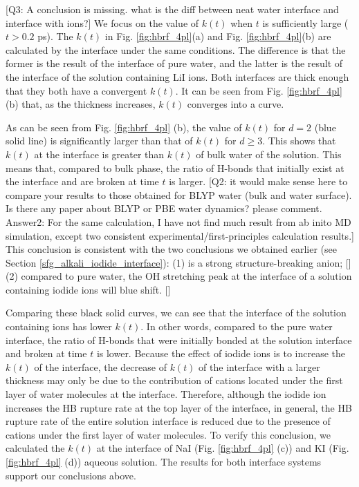 {\color{red}[Q3: A conclusion is missing. what is the diff between neat water interface and interface with ions?]}
{\color{blue} We focus on the value of $k(t)$ when $t$ is sufficiently large ($t>0.2$ ps). 
The $k(t)$ in Fig. \ref{fig:hbrf_4pl}(a) and Fig. \ref{fig:hbrf_4pl}(b) are calculated by the interface 
under the same conditions. The difference is that the former is the result of the interface of pure water,
and the latter is the result of the interface of the solution containing LiI ions. 
Both interfaces are thick enough that they both have a convergent $k(t)$. 
It can be seen from Fig. \ref{fig:hbrf_4pl} (b) that, as the thickness increases, $k(t)$ converges into a curve.}

{\color{blue} As can be seen from Fig. \ref{fig:hbrf_4pl} (b), the value of $k (t)$ for $d = 2$ \A (blue solid line) is significantly larger 
than that of $k(t)$ for $d \ge 3$. This shows that $k(t)$ at the interface is greater than $k(t)$ of bulk water of the solution. 
This means that, compared to bulk phase, the ratio of H-bonds that initially exist at the interface and are broken at time $t$ is larger.
{\color{red}[Q2: it would make sense here to compare your results to those obtained for BLYP water (bulk and water surface). Is there any paper about BLYP or PBE water dynamics? please comment. Answer2: For the same calculation, I have not find much result from ab inito MD simulation, except 
two consistent experimental/first-principles calculation results.]}
This conclusion is consistent with the two conclusions we obtained earlier (see Section \ref{sfg_alkali_iodide_interface}): 
(1) \I is a strong structure-breaking anion; [\cite{Trevani2000}] 
(2) compared to pure water, the OH stretching peak at the interface of a solution containing iodide ions will blue shift. [\cite{Tongraar2010}] 

Comparing these black solid curves, we can see that the interface of the solution containing ions has lower $k(t)$.
In other words, compared to the pure water interface, 
the ratio of H-bonds that were initially bonded at the solution interface and broken at time $t$ is lower.
Because the effect of iodide ions is to increase the $k(t)$ of the interface, the decrease of $k (t)$ of the interface with a larger thickness
may only be due to the contribution of cations located under the first layer of water molecules at the interface. 
Therefore, although the iodide ion increases the HB rupture rate at the top layer of the interface, 
in general, the HB rupture rate of the entire solution interface is reduced due to the presence of cations under the first layer of water molecules. 
To verify this conclusion, we calculated the $k(t)$ at the interface of NaI (Fig. \ref{fig:hbrf_4pl} (c)) and KI (Fig. \ref{fig:hbrf_4pl} (d)) aqueous solution. 
The results for both interface systems support our conclusions above.}


